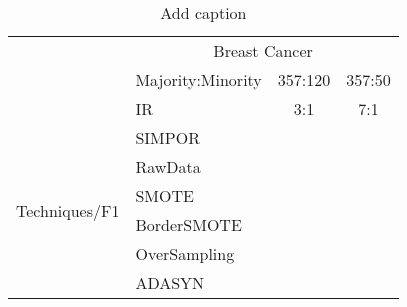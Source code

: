 \begin{table}[htbp]
  \centering
  \caption{Add caption}
    \begin{tabular}{|c|l|c|c|}
    \hline
          & \multicolumn{3}{c|}{Breast Cancer} \bigstrut\\
\cline{2-4}          & Majority:Minority & 357:120 & 357:50 \bigstrut\\
\cline{2-4}          & IR    & 3:1   & 7:1 \bigstrut\\
    \hline
    \multirow{6}[12]{*}{\begin{sideways}Techniques/F1\end{sideways}} & SIMPOR &       &  \bigstrut\\
\cline{2-4}          & RawData &       &  \bigstrut\\
\cline{2-4}          & SMOTE &       &  \bigstrut\\
\cline{2-4}          & BorderSMOTE &       &  \bigstrut\\
\cline{2-4}          & OverSampling &       &  \bigstrut\\
\cline{2-4}          & ADASYN &       &  \bigstrut\\
    \hline
    \end{tabular}%
  \label{tab:addlabel}%
\end{table}%
